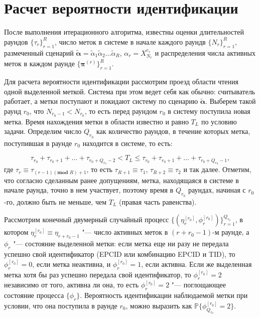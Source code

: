 \section{Расчет вероятности идентификации}
После выполнения итерационного алгоритма, известны оценки длительностей раундов $\{ \tau_r \}_{r=1}^R$, число меток в системе в начале каждого раундв $\{ N_r \}_{r=1}^R$, размеченный сценарий $\widetilde{\bm{\alpha}} = \widetilde{\alpha}_1 \widetilde{\alpha}_2 \dots \widetilde{\alpha}_R$, $\alpha_r = X_{N_r}^{e_r}$ и распределения числа активных меток в каждом раунде $\{ \bm{\pi}^{(r)} \}_{r=1}^R$.

Для расчета вероятности идентификации рассмотрим проезд области чтения одной выделенной меткой. Система при этом ведет себя как обычно: считыватель работает, а метки поступают и покидают систему по сценарию $\bm{\widetilde{\alpha}}$. Выберем такой раунд $r_0$, что $N_{r_0-1} < N_{r_0}$, то есть перед раундом $r_0$ в систему поступила новая метка. Время нахождения метки в области известно и равно $T_L$ по условию задачи. Определим число $Q_{r_0}$ как количество раундов, в течение которых метка, поступившая в раунде $r_0$ находится в системе, то есть:

$$
\tau_{r_0} + \tau_{r_0 + 1} + \dots + \tau_{r_0 + Q_{r_0} - 2} < T_L \leqslant \tau_{r_0} + \tau_{r_0 + 1} + \dots + \tau_{r_0 + Q_{r_0} - 1},
$$
где $\tau_{r} \equiv \tau_{(r - 1)(\textbf{mod } R) + 1}$, то есть $\tau_{R+1} \equiv \tau_1$, $\tau_{R+2} \equiv \tau_2$ и так далее. Отметим, что согласно сделанным ранее допущениям, метка, находящаяся в системе в начале раунда, точно в нем участвует, поэтому время в $Q_{r_0}$ раундах, начиная с $r_0$-го, должно быть не меньше, чем $T_L$ (правая часть равенства).

Рассмотрим конечный двумерный случайный процесс $\{ (\eta_r^{[r_0]}, \phi_r^{[r_0]}) \}_{r=1}^{Q_{r_0}}$, в котором $\eta_r^{[r_0]} \equiv \eta_{r+r_0-1}$ "--- число активных меток в $(r + r_0 - 1)$-м раунде, а $\phi_r$ "--- состояние выделенной метки: если метка еще ни разу не передала успешно свой идентификатор (EPCID или комбинацию EPCID и TID), то $\phi_r^{[r_0]} = 0$, если метка неактивна, и $\phi_r^{[r_0]} = 1$, если активна. Если же выделенная метка хотя бы раз успешно передала свой идентификатор, то $\phi_r^{[r_0]} = 2$ независимо от того, активна ли она, то есть $\phi_r^{[r_0]} = 2$ "--- поглощающее состояние процесса $\{ \phi_r \}$. Вероятность идентификации наблюдаемой метки при условии, что она поступила в раунде $r_0$, можно выразить как $\mathbb{P}\{ \phi_{Q_{r_0}}^{[r_0]} = 2\}$.

